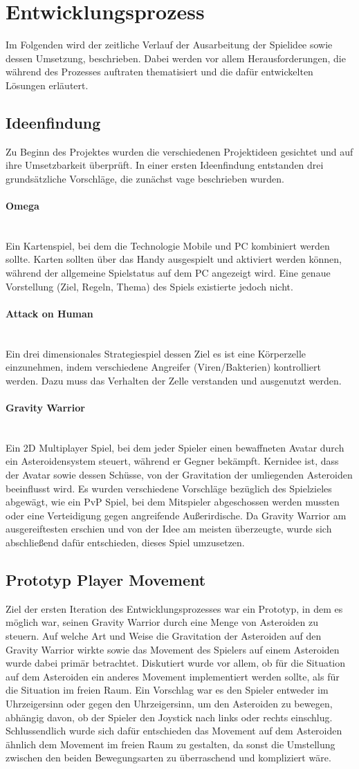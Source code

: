 \documentclass[11pt]{scrartcl}
\newcommand{\lbparagraph}[1]{\paragraph*{#1}\mbox{}\\}
\begin{document}
\newpage
\section{Entwicklungsprozess}
Im Folgenden wird der zeitliche Verlauf der Ausarbeitung der Spielidee sowie dessen Umsetzung, beschrieben. Dabei werden vor allem Herausforderungen, die während des Prozesses auftraten thematisiert und die dafür entwickelten Lösungen erläutert.
\subsection{Ideenfindung}
Zu Beginn des Projektes wurden die verschiedenen Projektideen gesichtet und auf ihre Umsetzbarkeit überprüft. In einer ersten Ideenfindung entstanden drei grundsätzliche Vorschläge, die zunächst vage beschrieben wurden.

\lbparagraph{Omega}
Ein Kartenspiel, bei dem die Technologie Mobile und PC kombiniert werden sollte. Karten sollten über das Handy ausgespielt und aktiviert werden können, während der allgemeine Spielstatus auf dem PC angezeigt wird. Eine genaue Vorstellung (Ziel, Regeln, Thema) des Spiels existierte jedoch nicht.
\lbparagraph{Attack on Human}
Ein drei dimensionales Strategiespiel dessen Ziel es ist eine Körperzelle einzunehmen, indem verschiedene Angreifer (Viren/Bakterien) kontrolliert werden. Dazu muss das Verhalten der Zelle verstanden und ausgenutzt werden.

\lbparagraph{Gravity Warrior}
Ein 2D Multiplayer Spiel, bei dem jeder Spieler einen bewaffneten Avatar durch ein Asteroidensystem steuert, während er Gegner bekämpft. Kernidee ist, dass der Avatar sowie dessen Schüsse, von der Gravitation der umliegenden Asteroiden beeinflusst wird.
Es wurden verschiedene Vorschläge bezüglich des Spielzieles abgewägt, wie ein PvP Spiel, bei dem Mitspieler abgeschossen werden mussten oder eine Verteidigung gegen angreifende Außerirdische. Da Gravity Warrior am ausgereiftesten erschien und von der Idee am meisten überzeugte, wurde sich abschließend dafür entschieden, dieses Spiel umzusetzen.

\subsection{Prototyp Player Movement}
Ziel der ersten Iteration des Entwicklungsprozesses war ein Prototyp, in dem es möglich war, seinen Gravity Warrior durch eine Menge von Asteroiden zu steuern. Auf welche Art und Weise die Gravitation der Asteroiden auf den Gravity Warrior wirkte sowie das Movement des Spielers auf einem Asteroiden wurde dabei primär betrachtet. Diskutiert wurde vor allem, ob für die Situation auf dem Asteroiden ein anderes Movement implementiert werden sollte, als für die Situation im freien Raum. Ein Vorschlag war es den Spieler entweder im Uhrzeigersinn oder gegen den Uhrzeigersinn, um den Asteroiden zu bewegen, abhängig davon, ob der Spieler den Joystick nach links oder rechts einschlug. Schlussendlich wurde sich dafür entschieden das Movement auf dem Asteroiden ähnlich dem Movement im freien Raum zu gestalten, da sonst die Umstellung zwischen den beiden Bewegungsarten zu überraschend und kompliziert wäre.
\end{document}
